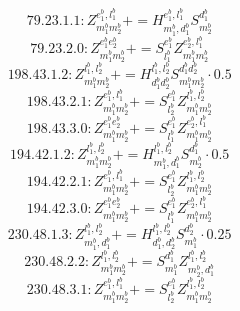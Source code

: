 \documentclass[letterpaper,10pt,fleqn,leqno,onecolumn]{article}
\begin{document}
\begin{equation} \;\;\;\;\;\;  79.23.1.1: Z^{e_{1}^{b},l_{1}^{b}}_{m_{1}^{b}m_{2}^{b}}+=H^{e_{1}^{b},l_{1}^{b}}_{m_{1}^{b},d_{1}^{b}}S^{d_{1}^{b}}_{m_{2}^{b}} \end{equation}
\begin{equation} \;\;\;\;\;\;  79.23.2.0: Z^{e_{1}^{b}e_{2}^{b}}_{m_{1}^{b}m_{2}^{b}}+=S^{e_{1}^{b}}_{l_{1}^{b}}Z^{e_{2}^{b},l_{1}^{b}}_{m_{1}^{b}m_{2}^{b}} \end{equation}
\begin{equation} \;\;\;\;\;\;  198.43.1.2: Z^{l_{1}^{b},l_{2}^{b}}_{m_{1}^{b}m_{2}^{b}}+=H^{l_{1}^{b},l_{2}^{b}}_{d_{1}^{b}d_{2}^{b}}S^{d_{1}^{b}d_{2}^{b}}_{m_{1}^{b}m_{2}^{b}}\cdot 0.5 \end{equation}
\begin{equation} \;\;\;\;\;\;  198.43.2.1: Z^{e_{1}^{b},l_{1}^{b}}_{m_{1}^{b}m_{2}^{b}}+=S^{e_{1}^{b}}_{l_{2}^{b}}Z^{l_{1}^{b},l_{2}^{b}}_{m_{1}^{b}m_{2}^{b}} \end{equation}
\begin{equation} \;\;\;\;\;\;  198.43.3.0: Z^{e_{1}^{b}e_{2}^{b}}_{m_{1}^{b}m_{2}^{b}}+=S^{e_{1}^{b}}_{l_{1}^{b}}Z^{e_{2}^{b},l_{1}^{b}}_{m_{1}^{b}m_{2}^{b}} \end{equation}
\begin{equation} \;\;\;\;\;\;  194.42.1.2: Z^{l_{1}^{b},l_{2}^{b}}_{m_{1}^{b}m_{2}^{b}}+=H^{l_{1}^{b},l_{2}^{b}}_{m_{1}^{b},d_{1}^{b}}S^{d_{1}^{b}}_{m_{2}^{b}}\cdot 0.5 \end{equation}
\begin{equation} \;\;\;\;\;\;  194.42.2.1: Z^{e_{1}^{b},l_{1}^{b}}_{m_{1}^{b}m_{2}^{b}}+=S^{e_{1}^{b}}_{l_{2}^{b}}Z^{l_{1}^{b},l_{2}^{b}}_{m_{1}^{b}m_{2}^{b}} \end{equation}
\begin{equation} \;\;\;\;\;\;  194.42.3.0: Z^{e_{1}^{b}e_{2}^{b}}_{m_{1}^{b}m_{2}^{b}}+=S^{e_{1}^{b}}_{l_{1}^{b}}Z^{e_{2}^{b},l_{1}^{b}}_{m_{1}^{b}m_{2}^{b}} \end{equation}
\begin{equation} \;\;\;\;\;\;  230.48.1.3: Z^{l_{1}^{b},l_{2}^{b}}_{m_{1}^{b},d_{1}^{b}}+=H^{l_{1}^{b},l_{2}^{b}}_{d_{1}^{b},d_{2}^{b}}S^{d_{2}^{b}}_{m_{1}^{b}}\cdot 0.25 \end{equation}
\begin{equation} \;\;\;\;\;\;  230.48.2.2: Z^{l_{1}^{b},l_{2}^{b}}_{m_{1}^{b}m_{2}^{b}}+=S^{d_{1}^{b}}_{m_{1}^{b}}Z^{l_{1}^{b},l_{2}^{b}}_{m_{2}^{b},d_{1}^{b}} \end{equation}
\begin{equation} \;\;\;\;\;\;  230.48.3.1: Z^{e_{1}^{b},l_{1}^{b}}_{m_{1}^{b}m_{2}^{b}}+=S^{e_{1}^{b}}_{l_{2}^{b}}Z^{l_{1}^{b},l_{2}^{b}}_{m_{1}^{b}m_{2}^{b}} \end{equation}
\end{document}
